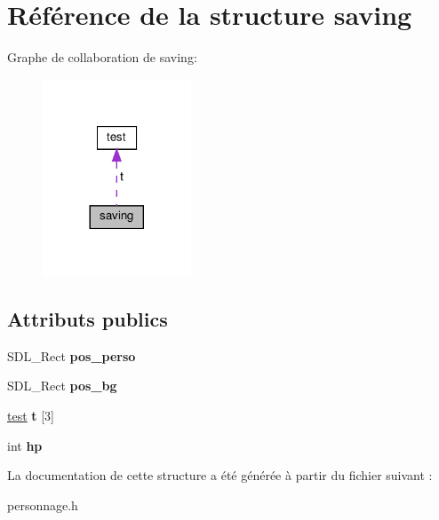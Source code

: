 \hypertarget{structsaving}{}\section{Référence de la structure saving}
\label{structsaving}


Graphe de collaboration de saving\+:\nopagebreak
\begin{figure}[H]
\begin{center}
\leavevmode
\includegraphics[width=125pt]{structsaving__coll__graph}
\end{center}
\end{figure}
\subsection*{Attributs publics}
\begin{DoxyCompactItemize}
\item 
\mbox{\label{structsaving_aca94e80d9a13f26fbd0cf7a2b0209842}} 
S\+D\+L\+\_\+\+Rect {\bfseries pos\+\_\+perso}
\item 
\mbox{\label{structsaving_afcc79338d07307a3532e7466455608f5}} 
S\+D\+L\+\_\+\+Rect {\bfseries pos\+\_\+bg}
\item 
\mbox{\label{structsaving_af5f6643245e497f8764585c38b36ff86}} 
\hyperlink{structtest}{test} {\bfseries t} \mbox{[}3\mbox{]}
\item 
\mbox{\label{structsaving_ac753d825770022e56ffbd1c2c520b844}} 
int {\bfseries hp}
\end{DoxyCompactItemize}


La documentation de cette structure a été générée à partir du fichier suivant \+:\begin{DoxyCompactItemize}
\item 
personnage.\+h\end{DoxyCompactItemize}
